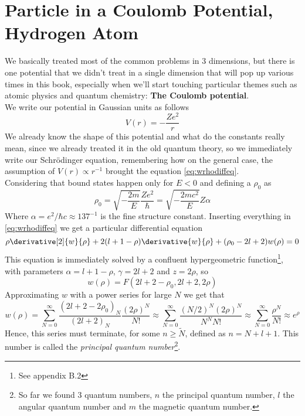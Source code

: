 \documentclass[a4paper, 11pt]{book}
\newcommand{\1}{\opr{\mathds{1}}}
\theoremstyle{plain}
\begin{document}
	\section{Particle in a Coulomb Potential, Hydrogen Atom}
	We basically treated most of the common problems in 3 dimensions, but there is one potential that we didn't treat in a single dimension that will pop up various times in this book, especially when we'll start touching particular themes such as atomic physics and quantum chemistry: \textbf{The Coulomb potential}.\\
	We write our potential in Gaussian units as follows
	\begin{equation}
		V(r)=-\frac{Ze^2}{r}
		\label{eq:coulpot}
	\end{equation}
	We already know the shape of this potential and what do the constants really mean, since we already treated it in the old quantum theory, so we immediately write our Schrödinger equation, remembering how on the general case, the assumption of $V(r)\propto r^{-1}$ brought the equation \eqref{eq:wrhodiffeq}.\\
	Considering that bound states happen only for $E<0$ and defining a $\rho_0$ as
	\begin{equation*}
		\rho_0=\sqrt{-\frac{2m}{E}}\frac{Ze^2}{\hbar}=\sqrt{-\frac{2mc^2}{E}}Z\alpha
	\end{equation*}
	Where $\alpha=e^2/\hbar c\approx137^{-1}$ is the fine structure constant. Inserting everything in \eqref{eq:wrhodiffeq} we get a particular differential equation
	\begin{equation}
		\rho\derivative[2]{w}{\rho}+2(l+1-\rho)\derivative{w}{\rho}+(\rho_0-2l+2)w(\rho)=0
		\label{eq:kummerequation}
	\end{equation}
	This equation is immediately solved by a confluent hypergeometric function\footnote{See appendix B.2}, with parameters $\alpha=l+1-\rho$, $\gamma=2l+2$ and $z=2\rho$, so
	\begin{equation}
		w(\rho)=F\left( 2l+2-\rho_0,2l+2,2\rho \right)
		\label{eq:wtochf}
	\end{equation}
	Approximating $w$ with a power series for large $N$ we get that
	\begin{equation*}
		w(\rho)=\sum_{N=0}^{\infty}\frac{\left( 2l+2-2\rho_0 \right)_N}{\left( 2l+2 \right)_N}\frac{(2\rho)^N}{N!}\approx\sum_{N=0}^{\infty}\frac{(N/2)^N(2\rho)^N}{N^NN!}\approx\sum_{N=0}^{\infty}\frac{\rho^N}{N!}\approx e^{\rho}
	\end{equation*}
	Hence, this series must terminate, for some $n\ge\tilde{N}$, defined as $n=N+l+1$. This number is called the \textit{principal quantum number}\footnote{So far we found 3 quantum numbers, $n$ the principal quantum number, $l$ the angular quantum number and $m$ the magnetic quantum number.}.\\
\end{document}
